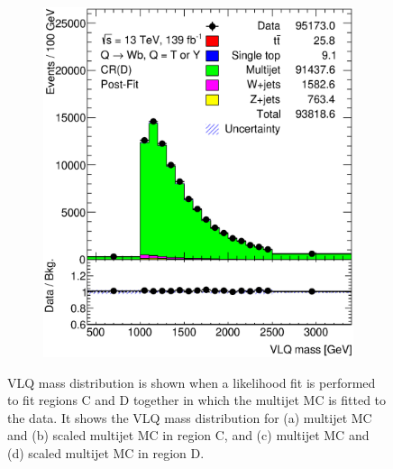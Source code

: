 \begin{figure}[hbt!]
\begin{subfigure}{.35\textwidth}
		\caption{}
	\end{subfigure}\hspace{0.6cm}
	\begin{subfigure}{.35\textwidth}
		\centering
		\includegraphics[width=\linewidth,height=\textheight,keepaspectratio]{CR_D_VLQM_postFit.eps}
		\caption{}
	\end{subfigure}
	\caption{VLQ mass distribution is shown when a likelihood fit is performed to fit regions C and D together in which the multijet MC is fitted to the data. It shows the VLQ mass distribution for (a) multijet MC and (b) scaled multijet MC in region C, and (c) multijet MC and (d) scaled multijet MC in region D.}
	\label{fig:app:cd:vlqm}
\end{figure}



